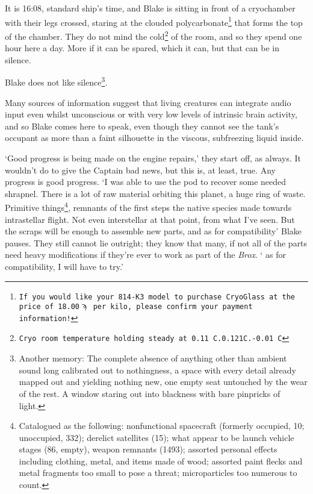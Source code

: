 It is 16:08, standard ship's time, and Blake is sitting in front of a
cryochamber with their legs crossed, staring at the clouded
polycarbonate\footnote{\texttt{If you would like your 814-K3 model to
purchase CryoGlass\texttrademark{} at the price of 18.00$\sampi$ per kilo,
please confirm your payment information!}} that forms the top of the
chamber. They do not mind the cold\footnote{\texttt{Cryo room
temperature holding steady at 0.11\textdegree
C\textellipsis{}.0.121\textdegree C\textellipsis{}.-0.01\textdegree
C\textellipsis{}}} of the room, and so they spend one hour here a
day. More if it can be spared, which it can, but that can be in
silence.

Blake does not like silence\footnote{Another memory: The complete
absence of anything other than ambient sound long calibrated out to
nothingness, a space with every detail already mapped out and yielding
nothing new, one empty seat untouched by the wear of the rest. A
window staring out into blackness with bare pinpricks of light.}.

Many sources of information suggest that living creatures can
integrate audio input even whilst unconscious or with very low levels
of intrinsic brain activity, and so Blake comes here to speak, even
though they cannot see the tank's occupant as more than a faint
silhouette in the viscous, subfreezing liquid inside.

`Good progress is being made on the engine repairs,' they start off,
as always. It wouldn't do to give the Captain bad news, but this is,
at least, true. Any progress is good progress. `I was able to use the
pod to recover some needed shrapnel. There is a lot of raw material
orbiting this planet, a huge ring of waste. Primitive
things\footnote{Catalogued as the following: nonfunctional spacecraft
(formerly occupied, 10; unoccupied, 332); derelict satellites (15);
what appear to be launch vehicle stages (86, empty), weapon remnants
(1493); assorted personal effects including clothing, metal, and items
made of wood; assorted paint flecks and metal fragments too small to
pose a threat; microparticles too numerous to count.}, remnants of
the first steps the native species made towards intrastellar
flight. Not even interstellar at that point, from what I've seen. But
the scraps will be enough to assemble new parts, and as for
compatibility\textemdash' Blake pauses. They still cannot lie
outright; they know that many, if not all of the parts need heavy
modifications if they're ever to work as part of the \textit{Brox}.
`\textemdash{} as for compatibility, I will have to try.'

